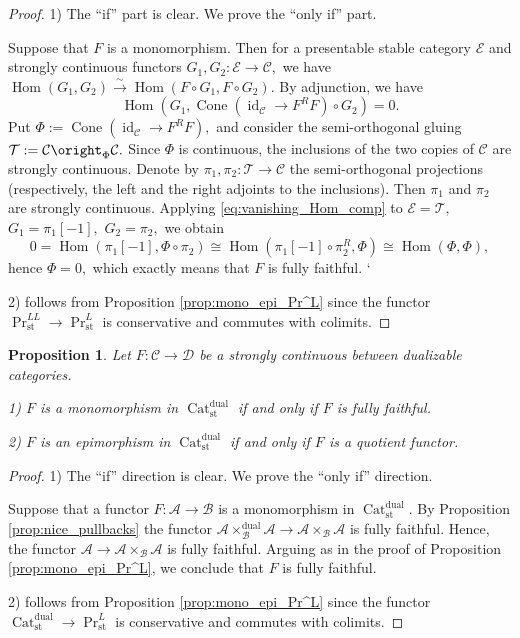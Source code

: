 \documentclass[11pt,leqno]{amsart}
\newtheorem{prop}[theo]{Proposition}
\numberwithin{equation}{section}
\def\Hom{\operatorname{Hom}}
\newcommand{\xto}{\xrightarrow}
\newcommand{\Cat}{\operatorname{Cat}}
\newcommand{\Cone}{\operatorname{Cone}}
\newcommand{\st}{\operatorname{st}}
\newcommand{\dual}{\operatorname{dual}}
\newcommand{\cD}{{\mathcal D}}
\newcommand{\cA}{{\mathcal A}}
\newcommand{\cB}{{\mathcal B}}
\newcommand{\cC}{{\mathcal C}}
\newcommand{\cE}{{\mathcal E}}
\newcommand{\cT}{{\mathcal T}}
\newcommand{\id}{\operatorname{id}}
\begin{document}
\begin{proof} 1) The ``if'' part is clear. We prove the ``only if'' part.

Suppose that $F$ is a monomorphism. Then for a presentable stable category $\cE$ and strongly continuous functors $G_1,G_2:\cE\to\cC,$ we have
$\Hom(G_1,G_2)\xto{\sim}\Hom(F\circ G_1,F\circ G_2).$ By adjunction, we have
\begin{equation}\label{eq:vanishing_Hom_comp} \Hom(G_1,\Cone(\id_{\cC}\to F^RF)\circ G_2)=0.\end{equation}
Put $\Phi:=\Cone(\id_{\cC}\to F^RF),$ and consider the semi-orthogonal gluing $\cT:=\cC\oright_{\Phi}\cC.$ Since $\Phi$ is continuous, the inclusions of the two copies of $\cC$ are strongly continuous. Denote by $\pi_1,\pi_2:\cT\to\cC$ the semi-orthogonal projections (respectively, the left and the right adjoints to the inclusions). Then $\pi_1$ and $\pi_2$ are strongly continuous. Applying \eqref{eq:vanishing_Hom_comp} to $\cE=\cT,$ $G_1=\pi_1[-1],$ $G_2=\pi_2,$ we obtain
$$0=\Hom(\pi_1[-1],\Phi\circ\pi_2)\cong\Hom(\pi_1[-1]\circ\pi_2^R,\Phi)\cong\Hom(\Phi,\Phi),$$
hence $\Phi=0,$ which exactly means that $F$ is fully faithful.  `

2) follows from Proposition \ref{prop:mono_epi_Pr^L} since the functor $\Pr_{\st}^{LL}\to\Pr_{\st}^L$ is conservative and commutes with colimits.
\end{proof}

\begin{prop}\label{prop:mono_epi_Cat^dual} Let $F:\cC\to\cD$ be a strongly continuous between dualizable categories.

1) $F$ is a monomorphism in $\Cat_{\st}^{\dual}$ if and only if $F$ is fully faithful. 

2) $F$ is an epimorphism in $\Cat_{\st}^{\dual}$ if and only if $F$ is a quotient functor.\end{prop}

\begin{proof}
1) The ``if'' direction is clear. We prove the ``only if'' direction. 

Suppose that a functor $F:\cA\to\cB$ is a monomorphism in $\Cat_{\st}^{\dual}.$ By Proposition \ref{prop:nice_pullbacks} the functor
$\cA\times_{\cB}^{\dual}\cA\to \cA\times_{\cB}\cA$ is fully faithful. Hence, the functor $\cA\to \cA\times_{\cB}\cA$ is fully faithful. Arguing as in the proof of Proposition \ref{prop:mono_epi_Pr^L}, we conclude that $F$ is fully faithful.

2) follows from Proposition \ref{prop:mono_epi_Pr^L} since the functor $\Cat_{\st}^{\dual}\to\Pr^L_{\st}$ is conservative and commutes with colimits.
\end{proof}
\end{document}
